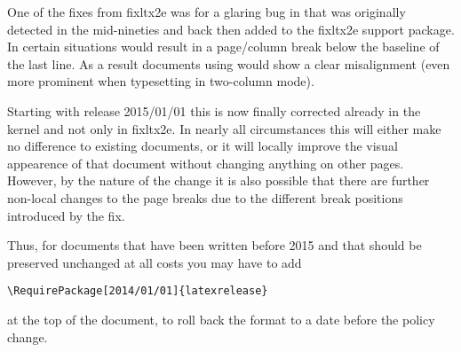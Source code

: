\documentclass{ltnews}
\begin{document}
One of the fixes from \textsf{fixltx2e} was for a glaring bug in
 that was originally detected in the mid-nineties and
back then added to the \textsf{fixltx2e} support package. In certain
situations  would result in a page/column break below
the baseline of the last line. As a result documents using
 would show a clear misalignment (even more prominent
when typesetting in two-column mode).

Starting with release 2015/01/01 this is now finally corrected already
in the kernel and not only in \textsf{fixltx2e}.  In nearly all
circumstances this will either make no difference to existing
documents, or it will locally improve the visual appearence of that
document without changing anything on other pages.  However, by the
nature of the change it is also possible that there are further
non-local changes to the page breaks due to the different break
positions introduced by the fix.

Thus, for documents that have been written before 2015 and that should
be preserved unchanged at all costs you may have to add
\begin{verbatim}
\RequirePackage[2014/01/01]{latexrelease}
\end{verbatim}
at the top of the document, to roll back the format to a date before
the policy change.
\end{document}
